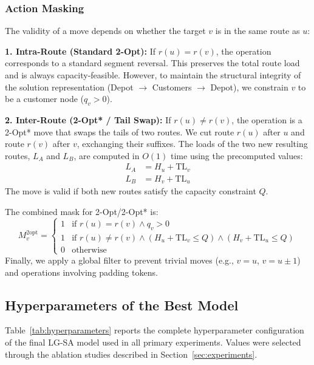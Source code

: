 \documentclass[letterpaper]{article} %
\begin{document}
\subsubsection{Action Masking}
The validity of a move depends on whether the target $v$ is in the same route as $u$:

\textbf{1. Intra-Route (Standard 2-Opt):}
If $r(u) = r(v)$, the operation corresponds to a standard segment reversal. This preserves the total route load and is always capacity-feasible. However, to maintain the structural integrity of the solution representation (Depot $\to$ Customers $\to$ Depot), we constrain $v$ to be a customer node ($q_v > 0$).

\textbf{2. Inter-Route (2-Opt* / Tail Swap):}
If $r(u) \neq r(v)$, the operation is a 2-Opt* move that swaps the tails of two routes. We cut route $r(u)$ after $u$ and route $r(v)$ after $v$, exchanging their suffixes. The loads of the two new resulting routes, $L_A$ and $L_B$, are computed in $O(1)$ time using the precomputed values:
\begin{align}
    L_A &= H_u + \mathrm{TL}_v \\
    L_B &= H_v + \mathrm{TL}_u
\end{align}
The move is valid if both new routes satisfy the capacity constraint $Q$.

The combined mask for 2-Opt/2-Opt* is:
\begin{equation}
    M_v^{\text{2opt}} =
    \begin{cases}
        1 & \text{if } r(u) = r(v) \land q_v > 0 \\
        1 & \text{if } r(u) \neq r(v) \land (H_u + \mathrm{TL}_v \leq Q) \land (H_v + \mathrm{TL}_u \leq Q) \\
        0 & \text{otherwise}
    \end{cases}
\end{equation}
Finally, we apply a global filter to prevent trivial moves (e.g., $v = u$, $v = u \pm 1$) and operations involving padding tokens.

\subsection{Hyperparameters of the Best Model}
\label{app:hyperparameters}

Table~\ref{tab:hyperparameters} reports the complete hyperparameter configuration of the final LG-SA model used in all primary experiments. Values were selected through the ablation studies described in Section~\ref{sec:experiments}.
\end{document}

